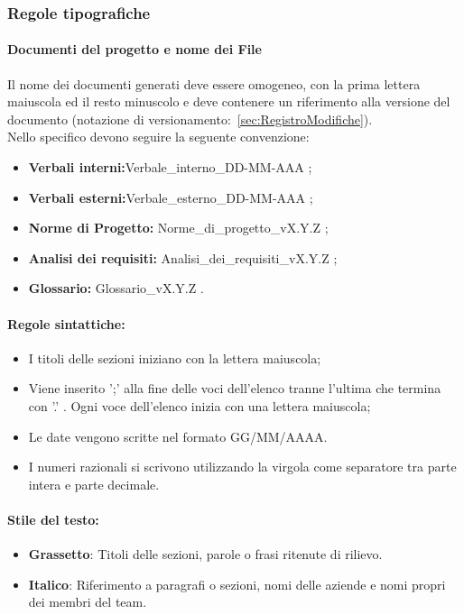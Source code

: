 \documentclass{article}
\begin{document}
    \subsubsection{Regole tipografiche}
    \paragraph*{Documenti del progetto e nome dei File}\label{sec:NomeFile}
    Il nome dei documenti generati deve essere omogeneo, con la prima lettera maiuscola ed il resto minuscolo e deve contenere un riferimento alla versione del documento (notazione di versionamento:~\ref{sec:RegistroModifiche}).\\
    Nello specifico devono seguire la seguente convenzione:
    \begin{itemize}
        \item \textbf{Verbali interni:}Verbale\_interno\_DD-MM-AAA ;
        \item \textbf{Verbali esterni:}Verbale\_esterno\_DD-MM-AAA ;
        \item \textbf{Norme di Progetto:} Norme\_di\_progetto\_vX.Y.Z ;
        \item \textbf{Analisi dei requisiti:} Analisi\_dei\_requisiti\_vX.Y.Z ;
        \item \textbf{Glossario:} Glossario\_vX.Y.Z .
    \end{itemize}
    
    \paragraph*{Regole sintattiche:}
    \begin{itemize}
        \item I titoli delle sezioni iniziano con la lettera maiuscola;
         \item Viene inserito ';' alla fine delle voci dell'elenco tranne l'ultima che termina con '.' . Ogni voce dell'elenco inizia con una lettera maiuscola;
        \item  Le date vengono scritte nel formato GG/MM/AAAA.
        \item  I numeri razionali si scrivono utilizzando la virgola come separatore tra parte intera e parte decimale.
        \end{itemize}
      \paragraph*{Stile del testo:}
      \begin{itemize}
\item \textbf{Grassetto}: Titoli delle sezioni, parole o frasi ritenute di rilievo. 
\item \textbf{Italico}: Riferimento a paragrafi o sezioni, nomi delle aziende e nomi propri dei membri del team.
    \end{itemize}
\end{document}
